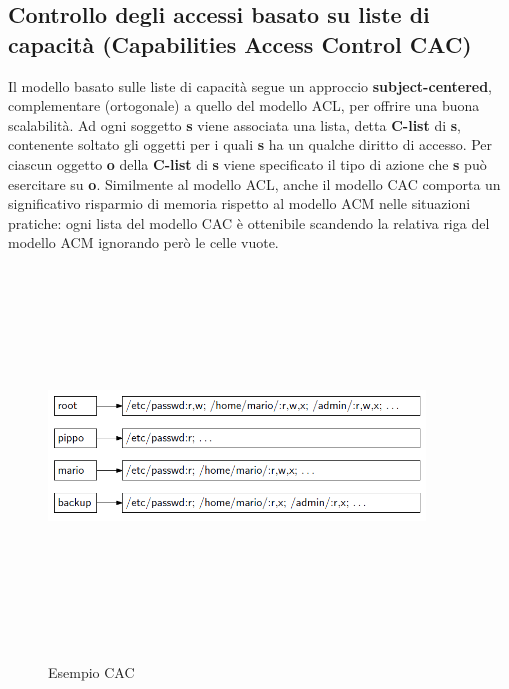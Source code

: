 \subsection{Controllo degli accessi basato su liste di capacità (Capabilities Access Control CAC)}
Il modello basato sulle liste di capacità segue un approccio \textbf{subject-centered}, complementare (ortogonale) a quello del modello ACL, per offrire una buona scalabilità. Ad ogni soggetto \textbf{s} viene associata una lista, detta \textbf{C-list} di \textbf{s}, contenente soltato gli oggetti per i quali \textbf{s} ha un qualche diritto di accesso. Per ciascun oggetto \textbf{o} della \textbf{C-list} di \textbf{s} viene specificato il tipo di azione che \textbf{s} può esercitare su \textbf{o}. Similmente al modello ACL, anche il modello CAC comporta un significativo risparmio di memoria rispetto al modello ACM nelle situazioni pratiche: ogni lista del modello CAC è ottenibile scandendo la relativa riga del modello ACM ignorando però le celle vuote. 
\begin{figure}[htbp]
	\centering%
	\subfigure%
	{\includegraphics[height=10cm, width=10cm, keepaspectratio]{Immagini/introduzione/CAC_ex.png}}
	\caption{Esempio CAC \label{fig:CAC}} 	
\end{figure}
